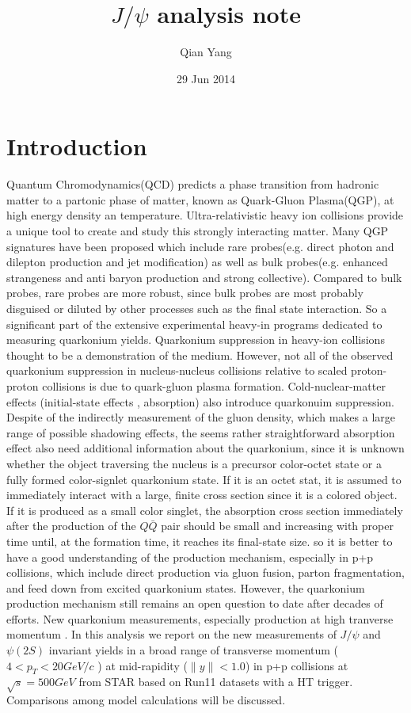 \documentclass[18pt,a4paper]{article}
\title{$J/\psi$ analysis note}
\author{Qian Yang}
\date{29 Jun 2014}
\begin{document}
\maketitle

\section{Introduction} 
Quantum Chromodynamics(QCD) predicts a phase transition from hadronic matter to a partonic phase of matter,  known as Quark-Gluon Plasma(QGP), at high energy density an temperature. Ultra-relativistic heavy ion collisions provide a unique tool to create and study this strongly interacting matter.  Many QGP signatures have been proposed which include rare probes(e.g. direct photon and dilepton production and jet modification) as well as bulk probes(e.g. enhanced strangeness and anti baryon production and strong collective). Compared to bulk probes, rare probes are more robust, since bulk probes are most probably disguised or diluted by other processes such as the final state interaction. So a significant part of the extensive experimental heavy-in programs dedicated to measuring quarkonium yields. Quarkonium suppression in heavy-ion collisions thought to be a demonstration of the medium. However, not all of the observed quarkonium suppression in nucleus-nucleus collisions relative to scaled proton-proton collisions is due to quark-gluon plasma formation. Cold-nuclear-matter effects (initial-state effects , absorption) also introduce quarkonuim suppression. Despite of the indirectly measurement of the gluon density, which makes a large range of possible shadowing effects, the seems rather straightforward absorption effect also need additional information about the quarkonium, since it is unknown whether the object traversing the nucleus is a precursor color-octet state or a fully formed  color-signlet quarkonium state. If it is an octet stat, it is assumed to immediately interact with a large,  finite cross section since it is a colored object.  If it is produced as a small color singlet, the absorption cross section immediately after the production of the $Q\bar{Q}$ pair should be small and increasing with proper time until, at the formation time, it reaches its final-state size. so it is better to have a good understanding of the production mechanism, especially in p+p collisions, which include direct production via gluon fusion, parton fragmentation, and feed down from excited quarkonium states. 
However, the quarkonium production mechanism still remains an open question to date after decades of efforts. New quarkonium measurements, especially production at high tranverse momentum . In this analysis  we report on the new measurements of $J/\psi$ and $\psi(2S)$ invariant yields in a broad range of transverse momentum ($4<p_T<20 GeV/c$ ) at mid-rapidity ($\|y\| < 1.0$) in p+p collisions at $ \sqrt{s}= 500 GeV$ from STAR based on Run11 datasets with a HT trigger. Comparisons among model calculations will be discussed.
\end{document}
